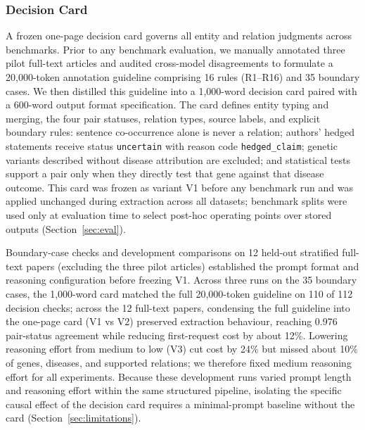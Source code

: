 \documentclass[preprint,10pt,letterpaper]{elsarticle}
\newcommand{\st}[1]{\texttt{#1}}             %
\begin{document}
\subsubsection{Decision Card}
A frozen one-page decision card governs all entity and relation judgments across benchmarks. Prior to any benchmark evaluation, we manually annotated three pilot full-text articles and audited cross-model disagreements to formulate a 20,000-token annotation guideline comprising 16 rules (R1--R16) and 35 boundary cases. We then distilled this guideline into a 1,000-word decision card paired with a 600-word output format specification. The card defines entity typing and merging, the four pair statuses, relation types, source labels, and explicit boundary rules: sentence co-occurrence alone is never a relation; authors' hedged statements receive status \st{uncertain} with reason code \st{hedged\_claim}; genetic variants described without disease attribution are excluded; and statistical tests support a pair only when they directly test that gene against that disease outcome. This card was frozen as variant V1 before any benchmark run and was applied unchanged during extraction across all datasets; benchmark splits were used only at evaluation time to select post-hoc operating points over stored outputs (Section~\ref{sec:eval}).

Boundary-case checks and development comparisons on 12 held-out stratified full-text papers (excluding the three pilot articles) established the prompt format and reasoning configuration before freezing V1. Across three runs on the 35 boundary cases, the 1,000-word card matched the full 20,000-token guideline on 110 of 112 decision checks; across the 12 full-text papers, condensing the full guideline into the one-page card (V1 vs V2) preserved extraction behaviour, reaching 0.976 pair-status agreement while reducing first-request cost by about 12\%. Lowering reasoning effort from medium to low (V3) cut cost by 24\% but missed about 10\% of genes, diseases, and supported relations; we therefore fixed medium reasoning effort for all experiments. Because these development runs varied prompt length and reasoning effort within the same structured pipeline, isolating the specific causal effect of the decision card requires a minimal-prompt baseline without the card (Section~\ref{sec:limitations}).
\end{document}
